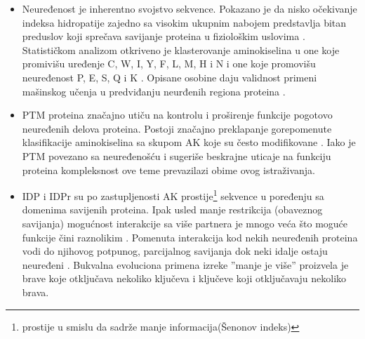 \begin{itemize}

  \item
    Neuređenost je inherentno svojstvo sekvence\parencite{dunker2001}.
    Pokazano je da nisko očekivanje indeksa hidropatije zajedno sa visokim
    ukupnim nabojem predstavlja bitan preduslov koji sprečava savijanje proteina
    u fiziološkim uslovima \parencite{uverksy}. Statističkom analizom otkriveno
    je klasterovanje aminokiselina u one koje promivišu uređenje C, W, I, Y, F,
    L, M, H i N  i one koje promovišu neuređenost P, E, S,
    Q i K . \parencite{oldfield2014, uversky2016}
    Opisane osobine daju validnost primeni mašinskog učenja u predviđanju
    neurđenih regiona proteina \parencite{oldfield2014}.

  \item
    PTM proteina značajno utiču na  kontrolu i proširenje funkcije pogotovo
    neuređenih delova proteina. Postoji značajno preklapanje gorepomenute
    klasifikacije aminokiselina sa skupom AK koje su često modifikovane
    \parencite{uversky2016}. Iako je PTM povezano sa neuređenošću i sugeriše
    beskrajne uticaje na funkciju proteina\parencite{uversky2016} kompleksnost
    ove teme prevazilazi obime ovog istraživanja.

  \item
    IDP i IDPr su po zastupljenosti AK prostije\footnote{ prostije u smislu da
    sadrže manje informacija(Šenonov indeks)} sekvence u poređenju sa domenima
    savijenih proteina. Ipak usled manje restrikcija (obaveznog savijanja)
    mogućnost interakcije sa više partnera je mnogo veća što moguće funkcije
    čini raznolikim \parencite{uversky2016}.  Pomenuta interakcija kod nekih
    neuređenih proteina vodi do njihovog potpunog, parcijalnog savijanja dok
    neki idalje ostaju neuređeni \parencite{uversky2016}.  Bukvalna evoluciona
    primena izreke ''manje je više'' proizvela je brave koje otključava
    nekoliko ključeva i ključeve koji otključavaju nekoliko brava.


\end{itemize}
